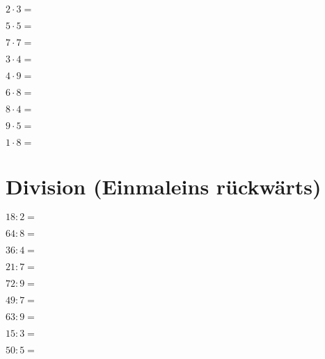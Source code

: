 \documentclass{article}
\begin{document}
\doublespacing

\begin{multicols}{3}
$2 \cdot 3 = $

$5 \cdot 5 = $

$7 \cdot 7 = $

$3 \cdot 4 = $

$4 \cdot 9 = $

$6 \cdot 8 = $

$8 \cdot 4 = $

$9 \cdot 5 = $

$1 \cdot 8 = $
\end{multicols}
\singlespacing

\section{Division (Einmaleins rückwärts)}

\doublespacing

\begin{multicols}{3}
$18 : 2 = $

$64 : 8 = $

$36 : 4 = $

$21 : 7 = $

$72 : 9 = $

$49 : 7 = $

$63 : 9 = $

$15 : 3 = $

$50 : 5 = $
\end{multicols}
\singlespacing
\end{document}
